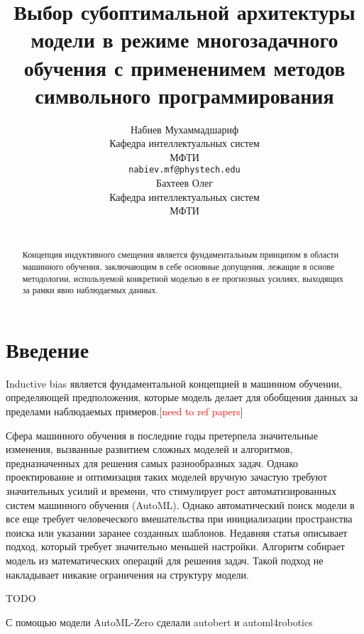 \documentclass{article}
\title{Выбор субоптимальной архитектуры модели в режиме многозадачного обучения с примененимем методов символьного программирования}
\author{
    Набиев Мухаммадшариф \\
    Кафедра интеллектуальных систем\\
    МФТИ\\
    \texttt{nabiev.mf@phystech.edu} \\
    \And
    Бахтеев Олег \\
    Кафедра интеллектуальных систем\\
    МФТИ\\
    \texttt{} \\
}
\date{}
\begin{document}
\maketitle

\begin{abstract}
Концепция индуктивного смещения является фундаментальным принципом в области машинного обучения, заключающим в себе основные допущения, лежащие в основе методологии, используемой конкретной моделью в ее прогнозных усилиях, выходящих за рамки явно наблюдаемых данных.

\end{abstract}


\section{Введение} 
Inductive bias является фундаментальной концепцией в машинном обучении, определяющей предположения, которые модель делает для обобщения данных за пределами наблюдаемых примеров.[\textcolor{red}{need to ref papers}] 


Сфера машинного обучения в последние годы претерпела значительные изменения, вызванные развитием сложных моделей и алгоритмов, предназначенных для решения самых разнообразных задач. Однако проектирование и оптимизация таких моделей вручную зачастую требуют значительных усилий и времени, что стимулирует рост автоматизированных систем машинного обучения (AutoML). Однако автоматический поиск модели в все еще требует человеческого вмешательства при инициализации пространства поиска или указании заранее созданных шаблонов. Недавняя статья\citep{automl-zero} описывает подход, который требует значительно меньшей настройки. Алгоритм собирает модель из математических операций для решения задач. Такой подход не накладывает никакие ограничения на структуру модели.

TODO

С помощью модели AutoML-Zero сделали autobert\citep{autobert} и automl4robotics\citep{automl4robots}
    
\end{document}
